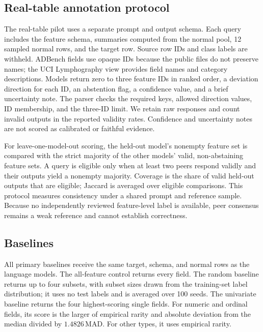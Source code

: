 \documentclass[conference]{IEEEtran}
\begin{document}
\subsection{Real-table annotation protocol}
The real-table pilot uses a separate prompt and output schema. Each query includes the feature schema, summaries computed from the normal pool, 12 sampled normal rows, and the target row. Source row IDs and class labels are withheld. ADBench fields use opaque IDs because the public files do not preserve names; the UCI Lymphography view provides field names and category descriptions. Models return zero to three feature IDs in ranked order, a deviation direction for each ID, an abstention flag, a confidence value, and a brief uncertainty note. The parser checks the required keys, allowed direction values, ID membership, and the three-ID limit. We retain raw responses and count invalid outputs in the reported validity rates. Confidence and uncertainty notes are not scored as calibrated or faithful evidence.

For leave-one-model-out scoring, the held-out model's nonempty feature set is compared with the strict majority of the other models' valid, non-abstaining feature sets. A query is eligible only when at least two peers respond validly and their outputs yield a nonempty majority. Coverage is the share of valid held-out outputs that are eligible; Jaccard is averaged over eligible comparisons. This protocol measures consistency under a shared prompt and reference sample. Because no independently reviewed feature-level label is available, peer consensus remains a weak reference and cannot establish correctness.

\subsection{Baselines}
All primary baselines receive the same target, schema, and normal rows as the language models. The all-feature control returns every field. The random baseline returns up to four subsets, with subset sizes drawn from the training-set label distribution; it uses no test labels and is averaged over 100 seeds. The univariate baseline returns the four highest-scoring single fields. For numeric and ordinal fields, its score is the larger of empirical rarity and absolute deviation from the median divided by $1.4826\,\mathrm{MAD}$. For other types, it uses empirical rarity.
\end{document}
